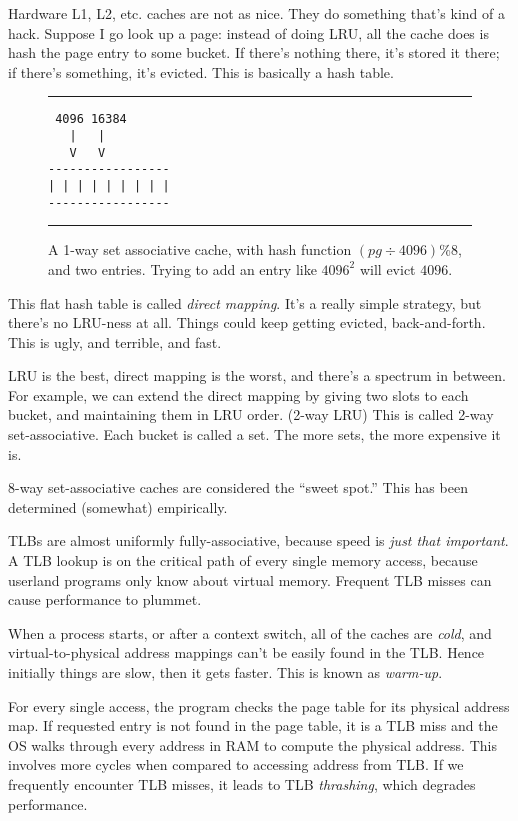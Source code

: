 \documentclass[twoside]{article}
\begin{document}
Hardware L1, L2, etc. caches are not as nice. They do something that's kind of a hack. Suppose I go look up a page: instead of doing LRU, all the cache does is hash the page entry to some bucket. If there's nothing there, it's stored it there; if there's something, it's evicted. This is basically a hash table.

\begin{figure}[h]
\rule{\textwidth}{1pt}
\begin{verbatim}
 4096 16384
   |   |
   V   V
-----------------
| | | | | | | | |
-----------------
\end{verbatim}
\rule{\textwidth}{1pt}
\caption{A 1-way set associative cache, with hash function $(pg \div 4096) \% 8$, and two entries. Trying to add an entry like $4096^2$ will evict $4096$.}
\end{figure}

This flat hash table is called \textit{direct mapping}. It's a really simple strategy, but there's no LRU-ness at all. Things could keep getting evicted, back-and-forth. This is ugly, and terrible, and fast.

LRU is the best, direct mapping is the worst, and there's a spectrum in between. For example, we can extend the direct mapping by giving two slots to each bucket, and maintaining them in LRU order. (2-way LRU) This is called 2-way set-associative. Each bucket is called a set. The more sets, the more expensive it is.

8-way set-associative caches are considered the ``sweet spot.'' This has been determined (somewhat) empirically.

TLBs are almost uniformly fully-associative, because speed is \textit{just that important}. A TLB lookup is on the critical path of every single memory access, because userland programs only know about virtual memory. Frequent TLB misses can cause performance to plummet.

When a process starts, or after a context switch, all of the caches are \textit{cold}, and virtual-to-physical address mappings can't be easily found in the TLB. Hence initially things are slow, then it gets faster. This is known as \textit{warm-up}.

For every single access, the program checks the page table for its physical address map. If requested entry is not found in the page table, it is a TLB miss and the OS walks through every address in RAM to compute the physical address. This involves more cycles when compared to accessing address from TLB. If we frequently encounter TLB misses, it leads to TLB \textit{thrashing}, which degrades performance.
\end{document}
